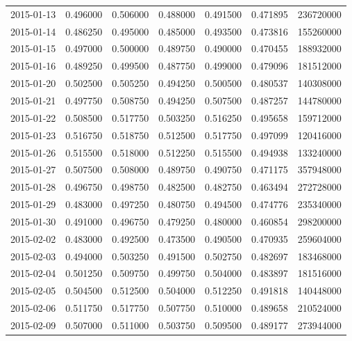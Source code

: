 \begin{tabular}{lrrrrrr}
2015-01-13 &    0.496000 &    0.506000 &    0.488000 &    0.491500 &    0.471895 &   236720000 \\
2015-01-14 &    0.486250 &    0.495000 &    0.485000 &    0.493500 &    0.473816 &   155260000 \\
2015-01-15 &    0.497000 &    0.500000 &    0.489750 &    0.490000 &    0.470455 &   188932000 \\
2015-01-16 &    0.489250 &    0.499500 &    0.487750 &    0.499000 &    0.479096 &   181512000 \\
2015-01-20 &    0.502500 &    0.505250 &    0.494250 &    0.500500 &    0.480537 &   140308000 \\
2015-01-21 &    0.497750 &    0.508750 &    0.494250 &    0.507500 &    0.487257 &   144780000 \\
2015-01-22 &    0.508500 &    0.517750 &    0.503250 &    0.516250 &    0.495658 &   159712000 \\
2015-01-23 &    0.516750 &    0.518750 &    0.512500 &    0.517750 &    0.497099 &   120416000 \\
2015-01-26 &    0.515500 &    0.518000 &    0.512250 &    0.515500 &    0.494938 &   133240000 \\
2015-01-27 &    0.507500 &    0.508000 &    0.489750 &    0.490750 &    0.471175 &   357948000 \\
2015-01-28 &    0.496750 &    0.498750 &    0.482500 &    0.482750 &    0.463494 &   272728000 \\
2015-01-29 &    0.483000 &    0.497250 &    0.480750 &    0.494500 &    0.474776 &   235340000 \\
2015-01-30 &    0.491000 &    0.496750 &    0.479250 &    0.480000 &    0.460854 &   298200000 \\
2015-02-02 &    0.483000 &    0.492500 &    0.473500 &    0.490500 &    0.470935 &   259604000 \\
2015-02-03 &    0.494000 &    0.503250 &    0.491500 &    0.502750 &    0.482697 &   183468000 \\
2015-02-04 &    0.501250 &    0.509750 &    0.499750 &    0.504000 &    0.483897 &   181516000 \\
2015-02-05 &    0.504500 &    0.512500 &    0.504000 &    0.512250 &    0.491818 &   140448000 \\
2015-02-06 &    0.511750 &    0.517750 &    0.507750 &    0.510000 &    0.489658 &   210524000 \\
2015-02-09 &    0.507000 &    0.511000 &    0.503750 &    0.509500 &    0.489177 &   273944000 \\

\end{tabular}
